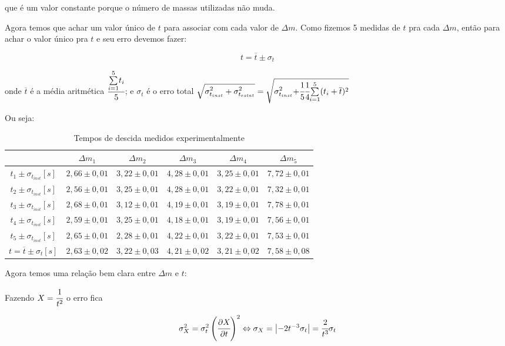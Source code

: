 \documentclass[a4paper]{article}
\providecommand{\tabularnewline}{\\} %
\begin{document}
que é um valor constante porque o número de massas utilizadas não muda.

Agora temos que achar um valor único de $t$ para associar com cada valor de $\Delta m$. Como fizemos 5 medidas de $t$ pra cada $\Delta m$, então para achar o valor único pra $t$ e seu erro devemos fazer:

$$t=\overline{t}\pm\sigma_{t}$$ 

onde $\overline{t}$ é a média aritmética $\cfrac[r]{\overset{{\scriptstyle 5}}{\underset{{\scriptstyle i=1}}{\sum}}t_{i}}{5}$; e $\sigma_{t}$ é o erro total $\sqrt{{\displaystyle \sigma_{t_{inst}}^{2}+\sigma_{t_{estat}}^{2}}}=\sqrt{{\displaystyle \sigma_{t_{inst}}^{2}+}\cfrac[r]{1}{5}\cfrac[l]{1}{4}\overset{{\scriptstyle 5}}{\underset{{\scriptstyle i=1}}{\sum}}(t_{i}+\overline{t})^{2}}$ 

Ou seja:
\begin{table}[!ht]
	\begin{centering}
	\caption{Tempos de descida medidos experimentalmente}
	\par\end{centering}
	\centering{}%
	\begin{tabular}{|c|c|c|c|c|c|}
	\cline{2-6} 
	\multicolumn{1}{c|}{} & $\Delta m_{1}$ & $\Delta m_{2}$ & $\Delta m_{3}$ & $\Delta m_{4}$ & $\Delta m_{5}$\tabularnewline	\hline 
	$t_{1}\pm\sigma_{t_{inst}}$$[s]$ & $2,66\pm0,01$ & $3,22\pm0,01$ & $4,28\pm0,01$ & $3,25\pm0,01$ & $7,72\pm0,01$\tabularnewline		\hline		$t_{2}\pm\sigma_{t_{inst}}$$[s]$ & $2,56\pm0,01$ & $3,25\pm0,01$ & $4,28\pm0,01$ & $3,22\pm0,01$ & $7,32\pm0,01$\tabularnewline		\hline 
	$t_{3}\pm\sigma_{t_{inst}}$$[s]$ & $2,68\pm0,01$ & $3,12\pm0,01$ & $4,19\pm0,01$ & $3,19\pm0,01$ & $7,78\pm0,01$\tabularnewline		\hline 
	$t_{4}\pm\sigma_{t_{inst}}$$[s]$ & $2,59\pm0,01$ & $3,25\pm0,01$ & $4,18\pm0,01$ & $3,19\pm0,01$ & $7,56\pm0,01$\tabularnewline		\hline 
	$t_{5}\pm\sigma_{t_{inst}}$$[s]$ & $2,65\pm0,01$ & $2,28\pm0,01$ & $4,22\pm0,01$ & $3,22\pm0,01$ & $7,53\pm0,01$\tabularnewline		\hline 
	$t=\overline{t}\pm\sigma_{t}$$[s]$ & $2,63\pm0,02$ & $3,22\pm0,03$ & $4,21\pm0,02$ & $3,21\pm0,02$ & $7,58\pm0,08$\tabularnewline	\hline 
	\end{tabular}
\end{table}

Agora temos uma relação bem clara entre $\Delta m$ e $t$:

Fazendo $X=\cfrac{1}{t^{2}}$ o erro fica

$$\sigma_{X}^{2}=\sigma_{t}^{2}\left(\cfrac{\partial X}{\partial t}\right)^{2}\Leftrightarrow\sigma_{X}=\left|-2t^{-3}\sigma_{t}\right|=\cfrac{2}{t^{3}}\sigma_{t}$$
\end{document}
